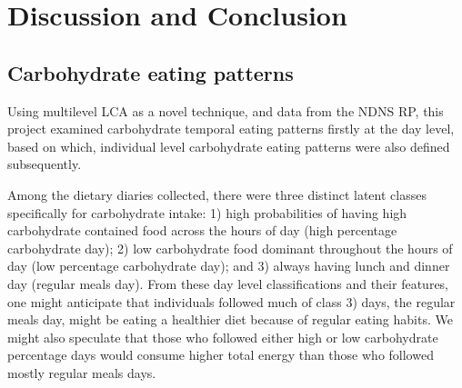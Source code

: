 
\chapter{Discussion and Conclusion} %

\label{Chapter 4} %







\section{Carbohydrate eating patterns}

Using multilevel LCA as a novel technique, and data from the NDNS RP, this project examined carbohydrate temporal eating patterns firstly at the day level, based on which, individual level carbohydrate eating patterns were also defined subsequently. 

Among the dietary diaries collected, there were three distinct latent classes specifically for carbohydrate intake: 1) high probabilities of having high carbohydrate contained food across the hours of day (high percentage carbohydrate day); 2) low carbohydrate food dominant throughout the hours of day (low percentage carbohydrate day); and 3) always having lunch and dinner day (regular meals day). From these day level classifications and their features, one might anticipate that individuals followed much of class 3) days, the regular meals day, might be eating a healthier diet because of regular eating habits. We might also speculate that those who followed either high or low carbohydrate percentage days would consume higher total energy than those who followed mostly regular meals days. 

